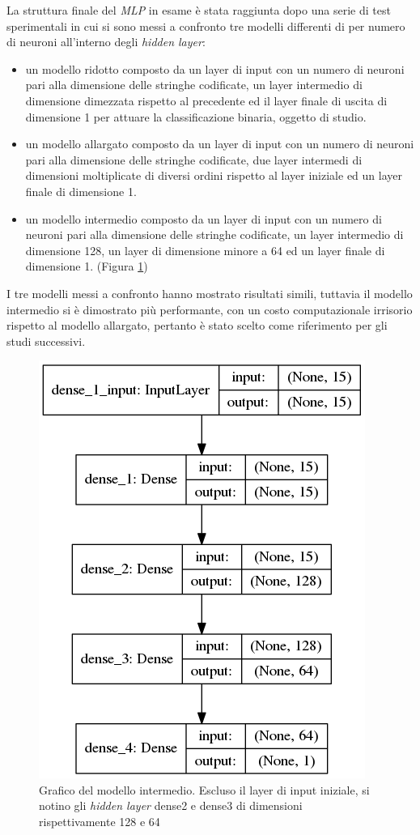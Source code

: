 La struttura finale del \textit{MLP} in esame è stata raggiunta dopo una serie di test sperimentali in cui si sono messi a confronto tre modelli differenti di per numero di neuroni all'interno degli \textit{hidden layer}: 
\begin{itemize}
\item un modello ridotto composto da un layer di input con un numero di neuroni pari alla dimensione delle stringhe codificate, un layer intermedio di dimensione dimezzata rispetto al precedente ed il layer finale di uscita di dimensione 1 per attuare la classificazione binaria, oggetto di studio.

\item un modello allargato composto da un layer di input con un numero di neuroni pari alla dimensione delle stringhe codificate, due layer intermedi di dimensioni moltiplicate di diversi ordini rispetto al layer iniziale ed un layer finale di dimensione 1.

\item un modello intermedio composto da un layer di input con un numero di neuroni pari alla dimensione delle stringhe codificate, un layer intermedio di dimensione 128, un layer di dimensione minore a 64 ed un layer finale di dimensione 1. (Figura \ref{fig:pieraz})

\end{itemize}

I tre modelli messi a confronto hanno mostrato risultati simili, tuttavia  il modello intermedio si è dimostrato più performante, con un costo computazionale irrisorio rispetto al modello allargato, pertanto è stato scelto come riferimento per gli studi successivi.

\begin{figure}[!htb]
    \centering
    \includegraphics[width=.6\columnwidth]{figures/pieraz_baseline.png}
    \caption{Grafico del modello intermedio. Escluso il layer di input iniziale, si notino gli \textit{hidden layer} dense2 e dense3 di dimensioni rispettivamente 128 e 64 }
\label{fig:pieraz}
\end{figure}

